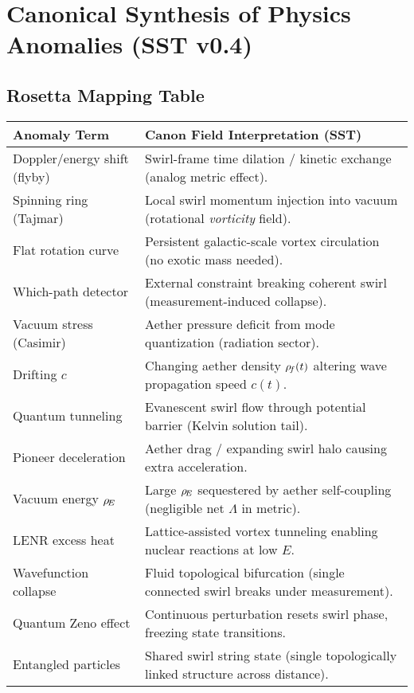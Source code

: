 \documentclass[11pt]{article}
\begin{document}
\chapter*{Canonical Synthesis of Physics Anomalies (SST v0.4)}

\section*{Rosetta Mapping Table}




\begin{tabular}{p{4.5cm} p{11cm}}
\textbf{Anomaly Term} & \textbf{Canon Field Interpretation (SST)} \\ \hline
Doppler/energy shift (flyby) & Swirl-frame time dilation / kinetic exchange (analog metric effect). \\
Spinning ring (Tajmar) & Local swirl momentum injection into vacuum (rotational \textit{vorticity} field). \\
Flat rotation curve & Persistent galactic-scale vortex circulation (no exotic mass needed). \\
Which-path detector & External constraint breaking coherent swirl (measurement-induced collapse). \\
Vacuum stress (Casimir) & Aether pressure deficit from mode quantization (radiation sector). \\
Drifting $c$ & Changing aether density $\rho_{\!f}(t)$ altering wave propagation speed $c(t)$. \\
Quantum tunneling & Evanescent swirl flow through potential barrier (Kelvin solution tail). \\
Pioneer deceleration & Aether drag / expanding swirl halo causing extra acceleration. \\
Vacuum energy $\rho_{\!E}$ & Large $\rho_{\!E}$ sequestered by aether self-coupling (negligible net $\Lambda$ in metric). \\
LENR excess heat & Lattice-assisted vortex tunneling enabling nuclear reactions at low $E$. \\
Wavefunction collapse & Fluid topological bifurcation (single connected swirl breaks under measurement). \\
Quantum Zeno effect & Continuous perturbation resets swirl phase, freezing state transitions. \\
Entangled particles & Shared swirl string state (single topologically linked structure across distance). \\
\end{tabular}
\end{document}
